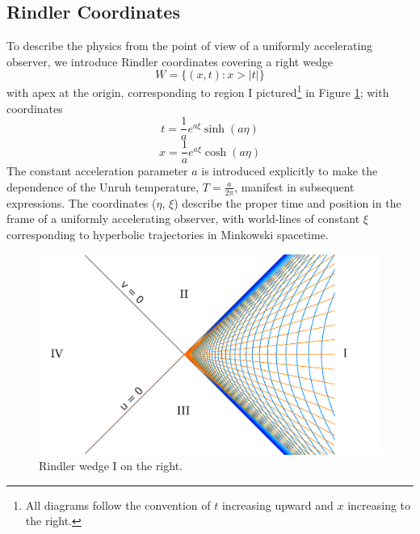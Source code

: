\documentclass[12pt,a4paper]{article}
\begin{document}
\subsection{Rindler Coordinates}

To describe the physics from the point of view of a uniformly accelerating observer, we introduce Rindler coordinates \cite{frodden2018unruh,rindler1966kruskal} covering a right wedge 
\begin{equation}
  W = \{(x,t) : x>|t|\}
\end{equation}
with apex at the origin, corresponding to region I pictured\footnote{All diagrams follow the convention of $t$ increasing upward and $x$ increasing to the right.} in Figure \ref{rindlerw}; with coordinates
\begin{equation}
  t = \frac{1}{a}e^{a\xi}\sinh{(a\eta)}
\label{sinh}
\end{equation}
\begin{equation}
x = \frac{1}{a}e^{a\xi}\cosh{(a\eta)}
\end{equation}
The constant acceleration parameter $a$ is introduced explicitly to make the dependence of the Unruh temperature, $T = \frac{a}{2\pi}$, manifest in subsequent expressions. The coordinates ($\eta$, $\xi$) describe the proper time and position in the frame of a uniformly accelerating observer, with world-lines of constant $\xi$ corresponding to hyperbolic trajectories in Minkowski spacetime.

\begin{figure}[h]
\centering
\includegraphics[scale=0.2]{rindler_w.png}
\caption{Rindler wedge I on the right.}
\label{rindlerw}
\end{figure}
\end{document}

